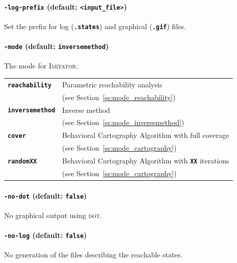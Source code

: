 \documentclass[a4paper,10pt]{article}
\newcommand{\gdot}{\textsc{dot}}
\newcommand{\imitator}{\textsc{Imitator}}
\newcommand{\code}[1]{\textbf{\texttt{#1}}}
\begin{document}
\paragraph{\code{-log-prefix} (default: \code{<input\_file>})}
Set the prefix for log (\code{.states}) and graphical (\code{.gif}) files.


\paragraph{\code{-mode} (default: \code{inversemethod})}
The mode for \imitator{}.

\begin{tabular}{@{} l @{\ \ } l}
 \code{reachability} & Parametric reachability analysis  \\
 & (see Section~\ref{ss:mode_reachability}) \\
 \code{inversemethod} & Inverse method \\
 & (see Section~\ref{ss:mode_inversemethod}) \\
 \code{cover} & Behavioral Cartography Algorithm with full coverage \\
 & (see Section~\ref{ss:mode_cartography}) \\
 \code{randomXX} & Behavioral Cartography Algorithm with \code{XX} iterations \\
  & (see Section~\ref{ss:mode_cartography}) \\
\end{tabular}


\paragraph{\code{-no-dot} (default: \code{false})}
No graphical output using \gdot{}.

\paragraph{\code{-no-log} (default: \code{false})}
No generation of the files describing the reachable states.
\end{document}
